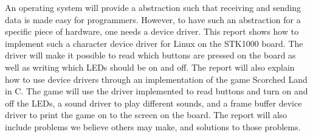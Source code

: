 An operating system will provide a abstraction such that receiving
and sending data is made easy for programmers. However, to have such an
abstraction for a specific piece of hardware, one needs a device driver.
This report shows how to implement such a character device driver for
Linux on the STK1000 board. The driver will make it possible to read
which buttons are pressed on the board as well as writing which LEDs
should be on and off. The report will also explain how to use device
drivers through an implementation of the game Scorched Land in C. The
game will use the driver implemented to read buttons and turn on and off
the LEDs, a sound driver to play different sounds, and a frame buffer
device driver to print the game on to the screen on the board. The
report will also include problems we believe others may make, and
solutions to those problems.
